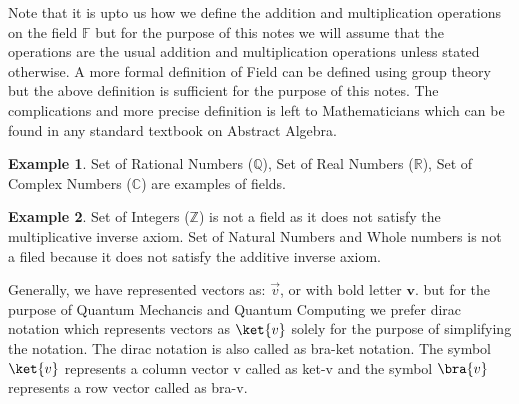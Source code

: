 \documentclass[12pt, oneside]{book}
\theoremstyle{definition}
\theoremstyle{definition}
\newtheorem{example}{Example}[section]
\theoremstyle{remark}
\begin{document}
Note that it is upto us how we define the addition and multiplication operations on the field $\mathbb{F}$ 
but for the purpose of this notes we will assume that the operations are the usual addition and multiplication operations unless stated otherwise.
A more formal definition of Field can be defined using group theory but the above definition is sufficient for the purpose of this notes.
The complications and more precise definition is left to Mathematicians which can be found in any standard textbook on Abstract Algebra.
\begin{example}
    Set of Rational Numbers ($\mathbb{Q}$), Set of Real Numbers ($\mathbb{R}$),
    Set of Complex Numbers ($\mathbb{C}$) are examples of fields.
\end{example}

\begin{example}
    Set of Integers ($\mathbb{Z}$) is not a field as it does not satisfy the multiplicative inverse axiom.
    Set of Natural Numbers and Whole numbers is not a filed because it does not satisfy the additive inverse axiom.
\end{example}

Generally, we have represented vectors as: $\vec{v}$, or with bold letter $\mathbf{v}$. but for the 
purpose of Quantum Mechancis and Quantum Computing we prefer dirac notation which represents vectors as $\ket{v}$ 
solely for the purpose of simplifying the notation. The dirac notation is also called as bra-ket notation. The 
symbol $\ket{v}$ represents a column vector v called as ket-v and the symbol $\bra{v}$ represents a 
row vector called as bra-v. 
\end{document}
